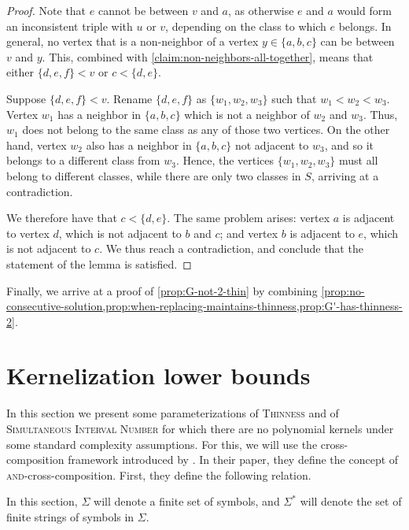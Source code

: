 \documentclass[11pt]{article}
\theoremstyle{plain}
\theoremstyle{definition}
\theoremstyle{remark}
\begin{document}
\begin{appendices}
\begin{proof}
Note that $e$ cannot be between $v$ and $a$, as otherwise $e$ and $a$ would form an inconsistent triple with $u$ or $v$, depending on the class to which $e$ belongs. In general, no vertex that is a non-neighbor of a vertex $y \in \{a,b,c\}$ can be between $v$ and $y$. 
This, combined with \cref{claim:non-neighbors-all-together}, means that either $\{d,e,f\} < v$ or $c < \{d,e\}$.

Suppose $\{d,e,f\} < v$. Rename $\{d,e,f\}$ as $\{w_1, w_2, w_3\}$ such that $w_1 < w_2 < w_3$. Vertex $w_1$ has a neighbor in $\{a,b,c\}$ which is not a neighbor of $w_2$ and $w_3$. Thus, $w_1$ does not belong to the same class as any of those two vertices. On the other hand, vertex $w_2$ also has a neighbor in $\{a,b,c\}$ not adjacent to $w_3$, and so it belongs to a different class from $w_3$. Hence, the vertices $\{w_1,w_2,w_3\}$ must all belong to different classes, while there are only two classes in $S$, arriving at a contradiction.

We therefore have that $c < \{d,e\}$. The same problem arises: vertex $a$ is adjacent to vertex $d$, which is not adjacent to $b$ and $c$; and vertex $b$ is adjacent to $e$, which is not adjacent to $c$. We thus reach a contradiction, and conclude that the statement of the lemma is satisfied.
\end{proof}

Finally, we arrive at a proof of \cref{prop:G-not-2-thin} by combining \cref{prop:no-consecutive-solution,prop:when-replacing-maintains-thinness,prop:G'-has-thinness-2}.

\section{Kernelization lower bounds}
\label{sec:lower-bounds}

In this section we present some parameterizations of \textsc{Thinness} {and of \textsc{Simultaneous Interval Number}} for which there are no polynomial kernels under some standard complexity assumptions. For this, we will use the cross-composition framework introduced by \citet{kernelization-cross-composition}. 
In their paper, they define the concept of \textsc{and}-cross-composition. First, they define the following relation. 

In this section, $\Sigma$ will denote a finite set of symbols, and $\Sigma^*$ will denote the set of finite strings of symbols in $\Sigma$. 


\end{appendices}
\end{document}
